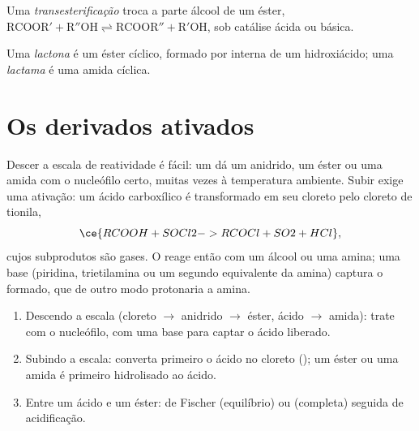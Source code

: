\begin{definition}[Transesterificação]\label{def:b2:acyl-substitution:transesterification}
Uma \emph{transesterificação} troca a parte álcool de um éster,
$\mathrm{RCOOR' + R''OH \rightleftharpoons RCOOR'' + R'OH}$, sob catálise ácida ou básica.
\end{definition}

\begin{definition}\label{def:b2:acyl-substitution:lactone}
Uma \emph{lactona} é um éster cíclico, formado por  interna de um
hidroxiácido; uma \emph{lactama} é uma amida cíclica.
\end{definition}

\section{Os derivados ativados}

Descer a escala de reatividade é fácil: um  dá um anidrido, um éster ou uma
amida com o nucleófilo certo, muitas vezes à temperatura ambiente. Subir exige uma ativação: um
ácido carboxílico é transformado em seu cloreto pelo cloreto de tionila,
\[
  \ce{RCOOH + SOCl2 -> RCOCl + SO2 + HCl} ,
\]
cujos subprodutos são gases. O  reage então com um álcool ou uma amina; uma base
(piridina, trietilamina ou um segundo equivalente da amina) captura o  formado, que
de outro modo protonaria a amina.

\begin{method}\label{met:b2:acyl-substitution:ladder}
\begin{enumerate}
  \item Descendo a escala (cloreto $\to$ anidrido $\to$ éster, ácido $\to$ amida): trate com o
        nucleófilo, com uma base para captar o ácido liberado.
  \item Subindo a escala: converta primeiro o ácido no cloreto (); um éster ou uma amida
        é primeiro hidrolisado ao ácido.
  \item Entre um ácido e um éster:  de Fischer (equilíbrio) ou 
        (completa) seguida de acidificação.
\end{enumerate}
\end{method}

